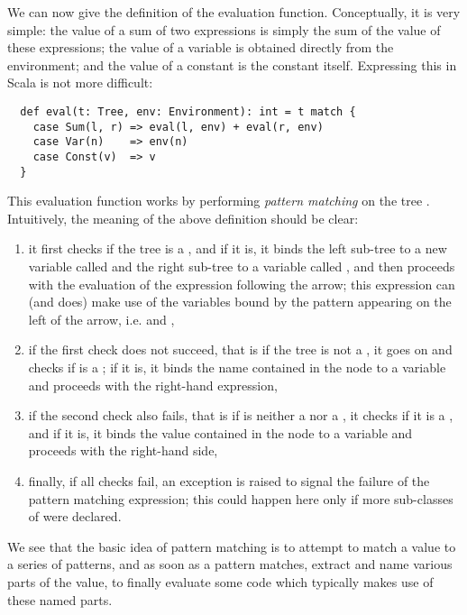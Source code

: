 \documentclass[a4paper,12pt,twoside,titlepage]{article}
\newcommand{\langname}[1]{#1\xspace}
\newcommand{\Scala}{\langname{Scala}}
\begin{document}
We can now give the definition of the evaluation function.
Conceptually, it is very simple: the value of a sum of two expressions
is simply the sum of the value of these expressions; the value of a
variable is obtained directly from the environment; and the value of a
constant is the constant itself. Expressing this in \Scala is not more
difficult:
\begin{lstlisting}
  def eval(t: Tree, env: Environment): int = t match {
    case Sum(l, r) => eval(l, env) + eval(r, env)
    case Var(n)    => env(n)
    case Const(v)  => v
  }
\end{lstlisting}
This evaluation function works by performing \emph{pattern matching}
on the tree . Intuitively, the meaning of the above definition
should be clear:
\begin{enumerate}
\item it first checks if the tree  is a , and if it
  is, it binds the left sub-tree to a new variable called  and
  the right sub-tree to a variable called , and then proceeds
  with the evaluation of the expression following the arrow; this
  expression can (and does) make use of the variables bound by the
  pattern appearing on the left of the arrow, i.e.  and
  ,
\item if the first check does not succeed, that is if the tree is not
  a , it goes on and checks if  is a ; if
  it is, it binds the name contained in the  node to a
  variable  and proceeds with the right-hand expression,
\item if the second check also fails, that is if  is neither a
   nor a , it checks if it is a , and
  if it is, it binds the value contained in the  node to a
  variable  and proceeds with the right-hand side,
\item finally, if all checks fail, an exception is raised to signal
  the failure of the pattern matching expression; this could happen
  here only if more sub-classes of  were declared.
\end{enumerate}
We see that the basic idea of pattern matching is to attempt to match
a value to a series of patterns, and as soon as a pattern matches,
extract and name various parts of the value, to finally evaluate some
code which typically makes use of these named parts.
\end{document}
